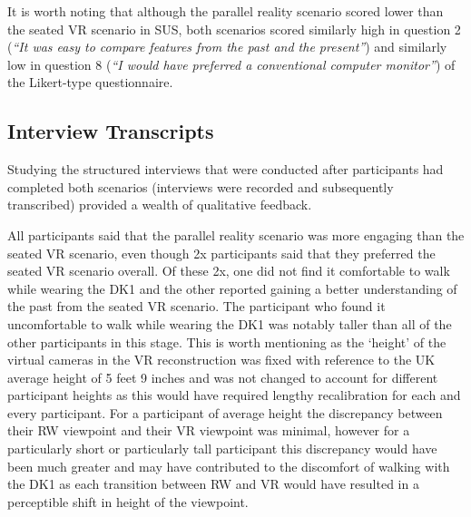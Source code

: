 It is worth noting that although the parallel reality scenario scored lower than the seated VR scenario in SUS, both scenarios scored similarly high in question 2 (\textit{``It was easy to compare features from the past and the present''}) and similarly low in question 8 (\textit{``I would have preferred a conventional computer monitor''}) of the Likert-type questionnaire.


\subsection{Interview Transcripts}
\label{stage1interviews}
Studying the structured interviews that were conducted after participants had completed both scenarios (interviews were recorded and subsequently transcribed) provided a wealth of qualitative feedback.

All participants said that the parallel reality scenario was more engaging than the seated VR scenario, even though 2x participants said that they preferred the seated VR scenario overall. Of these 2x,  one did not find it comfortable to walk while wearing the DK1 and the other reported gaining a better understanding of the past from the seated VR scenario. The participant who found it uncomfortable to walk while wearing the DK1 was notably taller than all of the other participants in this stage. This is worth mentioning as the `height' of the virtual cameras in the VR reconstruction was fixed with reference to the UK average height of 5 feet 9 inches and was not changed to account for different participant heights as this would have required lengthy recalibration for each and every participant. For a participant of average height the discrepancy between their RW viewpoint and their VR viewpoint was minimal, however for a particularly short or particularly tall participant this discrepancy would have been much greater and may have contributed to the discomfort of walking with the DK1 as each transition between RW and VR would have resulted in a perceptible shift in height of the viewpoint.

